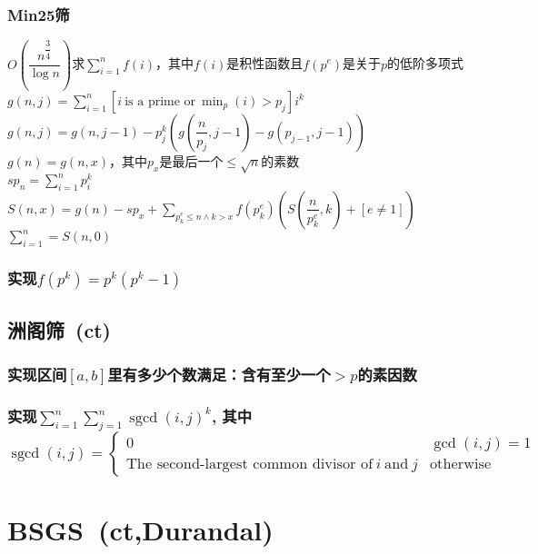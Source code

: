        \subsubsection*{Min25筛}
            $O(\dfrac{n^\dfrac{3}{4}}{\log n})$求$\sum\limits_{i = 1}^n f(i)$，其中$f(i)$是积性函数且$f(p^e)$是关于$p$的低阶多项式
            \\$g(n, j) = \sum\limits_{i = 1}^n [i~\text{is a prime or}~\min_p(i) > p_j] i^k$
            \\$g(n, j) = g(n, j - 1) - p_j^k\left( g\left( \dfrac{n}{p_j}, j - 1 \right) - g\left( p_{j - 1}, j - 1 \right) \right)$
            \\$g(n) = g(n, x)$，其中$p_x$是最后一个$\le \sqrt n$的素数
            \\$sp_n = \sum\limits_{i = 1}^n p_i^k$
            \\$S(n, x) = g(n) - sp_x + \sum\limits_{p_k^e \le n \wedge k > x} f(p_k^e) \left( S\left( \dfrac{n}{p_k^e}, k \right) + [e \ne 1] \right) $
            \\$\sum\limits_{i = 1}^n = S(n, 0)$
        \subsubsection*{实现$f(p^k) = p^k(p^k - 1)$}

    \subsection*{洲阁筛\ \small(ct)}
        \subsubsection*{实现区间$[a, b]$里有多少个数满足：含有至少一个$>p$的素因数}
        \subsubsection*{实现$\sum\limits_{i=1}^n \sum\limits_{j=1}^n \operatorname{sgcd}(i, j)^k$, 其中$\operatorname{sgcd}(i, j) = \begin{cases} 0 & \gcd(i, j) = 1 \\ \text{The second-largest common divisor of}~i~\text{and}~j & \text{otherwise} \end{cases}$}

\section{BSGS\ \small(ct,Durandal)}
